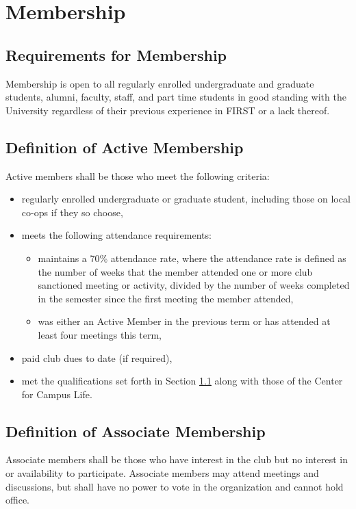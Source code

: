 \documentclass[english,11pt]{article}
\begin{document}
\section{Membership} \label{art:membership}

\subsection{Requirements for Membership} \label{sect:membership:requirements}
Membership is open to all regularly enrolled undergraduate and graduate students, alumni, faculty, staff, and part time students in good standing with the University regardless of their previous experience in FIRST or a lack thereof.

\subsection{Definition of Active Membership} \label{sect:membership:active}
Active members shall be those who meet the following criteria:
\begin{itemize}
    \item regularly enrolled undergraduate or graduate student, including those on local co-ops if they so choose,
    \item meets the following attendance requirements:
    \begin{itemize}
        \item maintains a 70\% attendance rate, where the attendance rate is defined as the number of weeks that the member attended one or more club sanctioned meeting or activity, divided by the number of weeks completed in the semester since the first meeting the member attended,
        \item was either an Active Member in the previous term or has attended at least four meetings this term,
    \end{itemize}
    \item paid club dues to date (if required),
    \item met the qualifications set forth in Section \ref{sect:membership:requirements} along with those of the Center for Campus Life.
\end{itemize}

\subsection{Definition of Associate Membership} \label{sect:membership:associate}
Associate members shall be those who have interest in the club but no interest in or availability to participate.
Associate members may attend meetings and discussions, but shall have no power to vote in the organization and cannot hold office.
\end{document}
